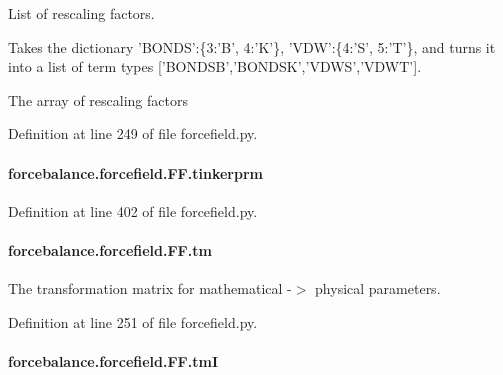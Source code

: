 List of rescaling factors. 

Takes the dictionary 'B\-O\-N\-D\-S'\-:\{3\-:'B', 4\-:'K'\}, 'V\-D\-W'\-:\{4\-:'S', 5\-:'T'\}, and turns it into a list of term types \mbox{[}'B\-O\-N\-D\-S\-B','B\-O\-N\-D\-S\-K','V\-D\-W\-S','V\-D\-W\-T'\mbox{]}.

The array of rescaling factors 

Definition at line 249 of file forcefield.\-py.

\hypertarget{classforcebalance_1_1forcefield_1_1FF_a62aa95ac960282ccae808ba05e3ecda1}{
\paragraph[{tinkerprm}]{\setlength{\rightskip}{0pt plus 5cm}forcebalance.\-forcefield.\-F\-F.\-tinkerprm}}\label{classforcebalance_1_1forcefield_1_1FF_a62aa95ac960282ccae808ba05e3ecda1}


Definition at line 402 of file forcefield.\-py.

\hypertarget{classforcebalance_1_1forcefield_1_1FF_aaf4763b05f3c1f7762d5c4d656ad106a}{
\paragraph[{tm}]{\setlength{\rightskip}{0pt plus 5cm}forcebalance.\-forcefield.\-F\-F.\-tm}}\label{classforcebalance_1_1forcefield_1_1FF_aaf4763b05f3c1f7762d5c4d656ad106a}


The transformation matrix for mathematical -\/$>$ physical parameters. 



Definition at line 251 of file forcefield.\-py.

\hypertarget{classforcebalance_1_1forcefield_1_1FF_a3a288d2514106e171af1d0e31311f97a}{
\paragraph[{tm\-I}]{\setlength{\rightskip}{0pt plus 5cm}forcebalance.\-forcefield.\-F\-F.\-tm\-I}}\label{classforcebalance_1_1forcefield_1_1FF_a3a288d2514106e171af1d0e31311f97a}


